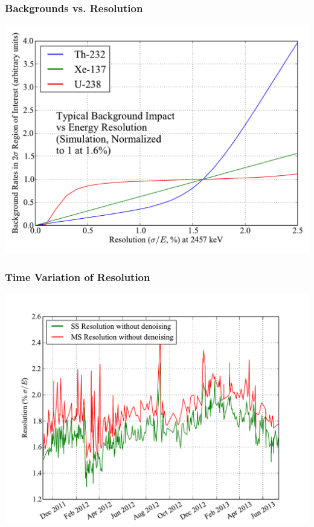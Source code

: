 \documentclass{beamer}
\begin{document}
\begin{frame}
\begin{center}
\frametitle{Backgrounds vs. Resolution}
\end{center}
\vspace{1cm}
\includegraphics[keepaspectratio=true,width=\textwidth]{BackgroundsVsRes.pdf}
\end{frame}

\begin{frame}
\begin{center}
\frametitle{Time Variation of Resolution}
\end{center}
\vspace{1cm}
\includegraphics[keepaspectratio=true,width=\textwidth]{ResolutionNoNoiseComparison.pdf}
\end{frame}
\end{document}
